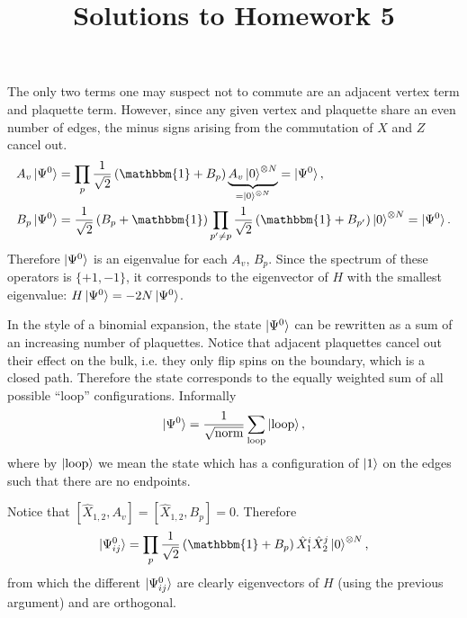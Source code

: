 \documentclass[a4paper,10pt,twoside]{article}
\def \id {{\mathbbm{1}}}
\theoremstyle{modern}
\begin{document}
\title{\vspace{-1cm}\sffamily Solutions to Homework 5\vspace{-1cm}}
\author{}
\date{}
\maketitle
\thispagestyle{fancy}

\begin{section}{}
The only two terms one may suspect not to commute are an adjacent vertex term and plaquette term. 
However, since any given vertex and plaquette share an even number of edges, the minus signs arising from the commutation of $X$ and $Z$ cancel out.
\begin{align*}
  A_v \ket{\Psi^0} &= \prod_p \frac{1}{\sqrt{2}} \left(\id + B_p\right) \underbrace{A_v \ket{0}^{\otimes N}}_{=\ket{0}^{\otimes N}} = \ket{\Psi^0} , \\
  B_p \ket{\Psi^0} &= \frac{1}{\sqrt{2}} \left(B_p + \id \right)\prod_{p^\prime \neq p} \frac{1}{\sqrt{2}} \left(\id + B_{p^\prime}\right) \ket{0}^{\otimes N} = \ket{\Psi^0} .
\end{align*}
Therefore $\ket{\Psi^0}$ is an eigenvalue for each $A_v$, $B_p$.
Since the spectrum of these operators is $\{+1,-1\}$, it corresponds to the eigenvector of $H$ with the smallest eigenvalue:  $H \ket{\Psi^0} = -2N \ket{\Psi^0}$.

In the style of a binomial expansion, the state $\ket{\Psi^0}$ can be rewritten as a sum of an increasing number of plaquettes.
Notice that adjacent plaquettes cancel out their effect on the bulk, i.e. they only flip spins on the boundary, which is a closed path.
Therefore the state corresponds to the equally weighted sum of all possible ``loop'' configurations.
Informally
\[
   \ket{\Psi^0} = \frac{1}{\sqrt{\rm norm}}\sum_{\rm loop} \ket{\rm loop},
\]
where by $\ket{\rm loop}$  we mean the state which has a configuration of $\ket{1}$ on the edges such that there are no endpoints.

Notice that $[\hat{X}_{1,2},A_v] =  [\hat{X}_{1,2},B_p] = 0$. 
Therefore
\[
  \ket{\Psi^0_{ij}} = \prod_p \frac{1}{\sqrt{2}} \left(\id + B_p\right) \hat{X}_1^i \hat{X}_2^j \ket{0}^{\otimes N},
\]
from which the different $\ket{\Psi_{ij}^0}$ are clearly eigenvectors of $H$ (using the previous argument) and are orthogonal.


\end{section}
\end{document}
